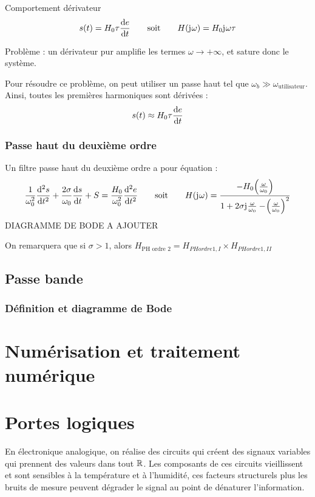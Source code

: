 \documentclass[a4paper,french,bookmarks]{book}
\begin{document}
    \begin{definition}{Comportement dérivateur}{}
    \[ s\!\left(t\right) = H_0\tau \dfrac{\mathrm d e}{\mathrm d t} \qquad\text{soit}\qquad H\!\left(\mathrm{j\mkern1mu}\omega\right) = H_0\mathrm{j\mkern1mu}\omega \tau\]
    \end{definition}
    
    Problème : un dérivateur pur amplifie les termes $\omega \to +\infty$, et sature donc le système.
    
    Pour résoudre ce problème, on peut utiliser un passe haut tel que $\omega_b \gg \omega_\text{utilisateur}$. Ainsi, toutes les premières harmoniques sont dérivées :
    \[ s\!\left(t\right) \approx H_0\tau\dfrac{\mathrm d e}{\mathrm d t}\]
    
    \subsubsection{Passe haut du deuxième ordre}
    
    Un filtre passe haut du deuxième ordre a pour équation :
    \[ \dfrac{1}{\omega_0^2} \dfrac{\mathrm d^2 s}{\mathrm d t^2} + \dfrac{2\sigma}{\omega_0}\dfrac{\mathrm d s}{\mathrm d t} + S = \dfrac{H_0}{\omega_0^2} \dfrac{\mathrm d^2 e}{\mathrm d t^2} \qquad\text{soit}\qquad H\!\left(\mathrm{j\mkern1mu}\omega\right) = \dfrac{-H_0\!\left(\frac{\omega}{\omega_0}\right)}{1 + 2\sigma\mathrm{j\mkern1mu}\frac{\omega}{\omega_0} - \!\left(\frac{\omega}{\omega_0}\right)^2} \]
    DIAGRAMME DE BODE A AJOUTER
    
    On remarquera que si $\sigma > 1$, alors $H_\text{PH ordre 2} = H_{PH ordre 1, I}\times H_{PH ordre 1, II}$

    \subsection{Passe bande}
    
    \subsubsection{Définition et diagramme de Bode}
    
    \section{Numérisation et traitement numérique}
    
    \section{Portes logiques}
    
    En électronique analogique, on réalise des circuits qui créent des signaux variables qui prennent des valeurs dans tout $\mathbb{R}$. Les composants de ces circuits vieillissent et sont sensibles à la température et à l'humidité, ces facteurs structurels plus les bruits de mesure peuvent dégrader le signal au point de dénaturer l'information.
    
\end{document}
